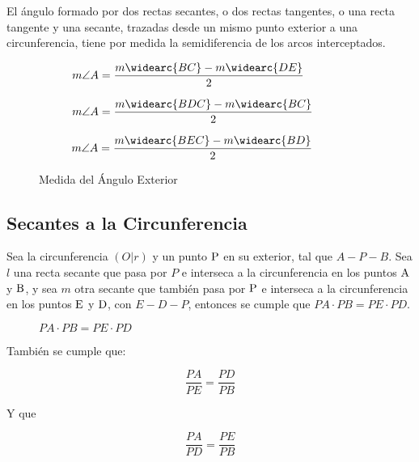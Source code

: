 \begin{theorem}
    El ángulo formado por dos rectas secantes, o dos rectas tangentes, o una recta tangente y una secante, trazadas desde un mismo punto exterior a una circunferencia, tiene por medida la semidiferencia de los arcos interceptados.


    \begin{figure}[h!]

        \centering

        \begin{subfigure}[b]{.33\textwidth}
            \centering
            
            \label{fig:theorem36}
            \caption{$m\angle{A}=\dfrac{m\widearc{BC}-m\widearc{DE}}{2}$}
        \end{subfigure}%
        \begin{subfigure}[b]{.33\textwidth}
            \centering
            
            \label{fig:theorem35}
            \caption{$m\angle{A}=\dfrac{m\widearc{BDC}-m\widearc{BC}}{2}$}
        \end{subfigure}%
        \begin{subfigure}[b]{.33\textwidth}
            \centering
            
            \label{fig:theorem37}
            \caption{$m\angle{A}=\dfrac{m\widearc{BEC}-m\widearc{BD}}{2}$}
        \end{subfigure}

        \centering
        \caption{Medida del Ángulo Exterior}
        \label{fig:exterior-angle-measure}
        
    \end{figure}        
   
    
\end{theorem}

\clearpage

\subsection{Secantes a la Circunferencia}

\begin{theorem}
    Sea la circunferencia $(O|r)$ y un punto $\rm P$ en su exterior, tal que $A-P-B$. Sea $l$ una recta secante que pasa por $P$ e interseca a la circunferencia en los puntos $\rm A$ y $\rm B$, y sea $m$ otra secante que también pasa por $\rm P$ e interseca a la circunferencia en los puntos $\rm E$ y $\rm D$, con $E-D-P$, entonces se cumple que $PA \cdot PB = PE \cdot PD$.

    \begin{figure}[!h]
        \centering
        
        \caption{$PA \cdot PB = PE \cdot PD$}
        \label{fig:theorem38}
    \end{figure}


    También se cumple que:

    $$\dfrac{PA}{PE}=\dfrac{PD}{PB}$$

    Y que 

    $$\dfrac{PA}{PD}=\dfrac{PE}{PB}$$
    
\end{theorem}

